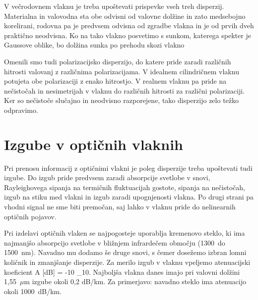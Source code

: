 V večrodovnem vlaknu je treba upoštevati prispevke vseh treh disperzij. Materialna
in valovodna sta obe odvisni od valovne dolžine in zato medsebojno korelirani, rodovna pa 
je predvsem odvisna od zgradbe vlakna in je od prvih dveh praktično neodvisna. Ko na 
tako vlakno posvetimo s sunkom, katerega spekter je Gaussove oblike, bo dolžina 
sunka po prehodu skozi vlakno

\begin{remark}
 Omenili smo tudi polarizacijsko disperzijo, do katere pride zaradi različnih hitrosti valovanj
 z različnima polarizacijama. V idealnem cilindričnem vlaknu potujeta obe polarizaciji
 z enako hitrostjo. V realnem vlaknu pa 
 pride na nečistočah in nesimetrijah v vlaknu do različnih hitrosti za različni polarizaciji.  
 Ker so nečistoče slučajno in neodvisno razporejene, tako disperzijo zelo težko odpravimo.
\end{remark}

\section{Izgube v optičnih vlaknih}
Pri prenosu informacij z optičnimi vlakni je poleg disperzije treba upoštevati tudi izgube. 
Do izgub pride predvsem zaradi absorpcije svetlobe v snovi,
Rayleighovega sipanja na termičnih fluktuacijah gostote, sipanja na nečistočah, 
izgub na stiku med vlakni in izgub zaradi upognjenosti vlakna. 
Po drugi strani pa vhodni signal ne sme biti premočan,
saj lahko v vlaknu pride do nelinearnih optičnih pojavov.

Pri izdelavi optičnih vlaken se najpogosteje uporablja kremenovo steklo, ki 
ima najmanjšo absorpcijo svetlobe v bližnjem infrardečem območju (1300~do 1500~nm).
Navadno mu dodamo še druge snovi, s čemer dosežemo izbran lomni količnik in 
zmanjšanje disperzije. Za merilo izgub v vlaknu vpeljemo atenuacijski koeficient 
\beq
A [dB] = -10 \log_{10}.
\eeq
Najboljša vlakna danes imajo pri valovni dolžini 1,55~$\mu$m izgube okoli 0,2 dB/km.
Za primerjavo: navadno steklo ima atenuacijo okoli 1000~dB/km.


